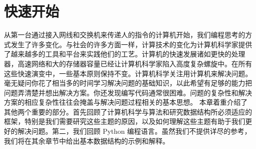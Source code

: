 \section{快速开始}

从第一台通过接入网线和交换机来传递人的指令的计算机开始，我们编程思考的方式发生了许多变化。与社会的许多方面一样，计算技术的变化为计算机科学家提供了越来越多的工具和平台来实践他们的工艺。计算机的快速发展诸如更快的处理器，高速网络和大的存储器容量已经让计算机科学家陷入高度复杂螺旋中。在所有这些快速演变中，一些基本原则保持不变。计算机科学关注用计算机来解决问题。
毫无疑问你花了相当多的时间学习解决问题的基础知识，以此希望有足够的能力把问题弄清楚并想出解决方案。你还发现编写代码通常很困难。问题的复杂性和解决方案的相应复杂性往往会掩盖与解决问题过程相关的基本思想。
本章着重介绍了其他两个重要的部分。首先回顾了计算机科学与算法和研究数据结构所必须适应的框架，特别是我们需要研究这些主题的原因，以及如何理解这些主题有助于我们更好的解决问题。第二，我们回顾 Python 编程语言。虽然我们不提供详尽的参考，我们将在其余章节中给出基本数据结构的示例和解释。 
